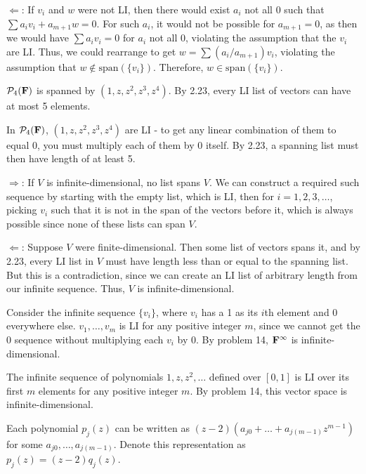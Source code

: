 \documentclass{article}
\begin{document}
$\Leftarrow$: If $v_i$ and $w$ were not LI, then there would exist $a_i$ not all
0 such that $\sum a_iv_i + a_{m+1}w = 0$. For such $a_i$, it would not be
possible for $a_{m+1} = 0$, as then we would have $\sum a_iv_i = 0$ for $a_i$
not all 0, violating the assumption that the $v_i$ are LI. Thus, we could
rearrange to get $w = \sum (a_i/a_{m+1})v_i$, violating the assumption that $w
\notin \text{span}(\{v_i\})$. Therefore, $w \in \text{span}(\{v_i\})$.


$\mathcal{P}_4(\mathbf{F})$ is spanned by $(1, z, z^2, z^3, z^4)$. By 2.23, every LI
list of vectors can have at most 5 elements.


In $\mathcal{P}_4(\mathbf{F})$, $(1, z, z^2, z^3, z^4)$ are LI - to get any linear
combination of them to equal 0, you must multiply each of them by 0 itself.
By 2.23, a spanning list must then have length of at least 5.


$\Rightarrow$: If $V$ is infinite-dimensional, no list spans $V$. We can
construct a required such sequence by starting with the empty list, which is LI,
then for $i = 1, 2, 3, \ldots$, picking $v_i$ such that it is not in the span of
the vectors before it, which is always possible since none of these lists can
span $V$.

$\Leftarrow$: Suppose $V$ were finite-dimensional. Then some list of vectors
spans it, and by 2.23, every LI list in $V$ must have length less than or equal
to the spanning list. But this is a contradiction, since we can create an LI
list of arbitrary length from our infinite sequence. Thus, $V$ is
infinite-dimensional.


Consider the infinite sequence $\{v_i\}$, where $v_i$ has a 1 as its $i$th
element and 0 everywhere else. $v_1, \ldots, v_m$ is LI for any positive integer
$m$, since we cannot get the 0 sequence without multiplying each $v_i$ by 0. By
problem 14, $\mathbf{F}^\infty$ is infinite-dimensional.


The infinite sequence of polynomials $1, z, z^2, \ldots$ defined over $[0, 1]$
is LI over its first $m$ elements for any positive integer $m$. By problem 14,
this vector space is infinite-dimensional.


Each polynomial $p_j(z)$ can be written as $(z-2)(a_{j0} + \ldots +
a_{j(m-1)}z^{m-1})$ for some $a_{j0}, \ldots, a_{j(m-1)}$. Denote this
representation as $p_j(z) = (z-2)q_j(z)$.
\end{document}
